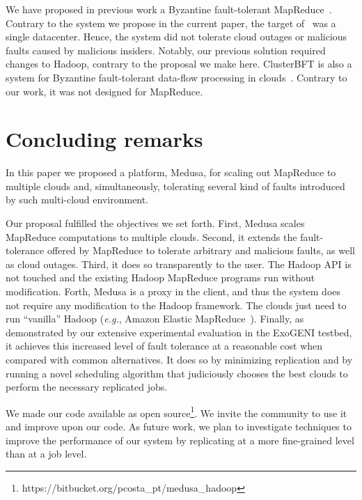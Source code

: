 \documentclass[10pt, conference, compsocconf]{IEEEtran}
\begin{document}
We have proposed in previous work a Byzantine fault-tolerant MapReduce~\cite{Costa2013}.
Contrary to the system we propose in the current paper, the target of~\cite{Costa2013} was a single datacenter.
Hence, the system did not tolerate cloud outages or malicious faults caused by malicious insiders.
Notably, our previous solution required changes to Hadoop, contrary to the proposal we make here.
ClusterBFT is also a system for Byzantine fault-tolerant data-flow processing in clouds~\cite{conf/middleware/StephenE13}.
Contrary to our work, it was not designed for MapReduce.







\section{Concluding remarks} \label{sec:conclusion}

In this paper we proposed a platform, Medusa, for scaling out MapReduce to multiple clouds and, simultaneously, tolerating several kind of faults introduced by such multi-cloud environment.

Our proposal fulfilled the objectives we set forth.
First, Medusa scales MapReduce computations to multiple clouds.
Second, it extends the fault-tolerance offered by MapReduce to tolerate arbitrary and malicious faults, as well as cloud outages.
Third, it does so transparently to the user.
The Hadoop API is not touched and the existing Hadoop MapReduce programs run without modification.
Forth, Medusa is a proxy in the client, and thus the system does not require any modification to the Hadoop framework. The clouds just need to run ``vanilla'' Hadoop (\textit{e.g.}, Amazon Elastic MapReduce~\cite{AmazonEMR2015}).
Finally, as demonstrated by our extensive experimental evaluation in the ExoGENI testbed, it achieves this increased level of fault tolerance at a reasonable cost when compared with common alternatives. It does so by minimizing replication and by running a novel scheduling algorithm that judiciously chooses the best clouds to perform the necessary replicated jobs.

We made our code available as open source\footnote{https://bitbucket.org/pcosta\_pt/medusa\_hadoop}.
We invite the community to use it and improve upon our code.
As future work, we plan to investigate techniques to improve the performance of our system by replicating at a more fine-grained level than at a job level.






{\small
{}
{}
}
\end{document}

